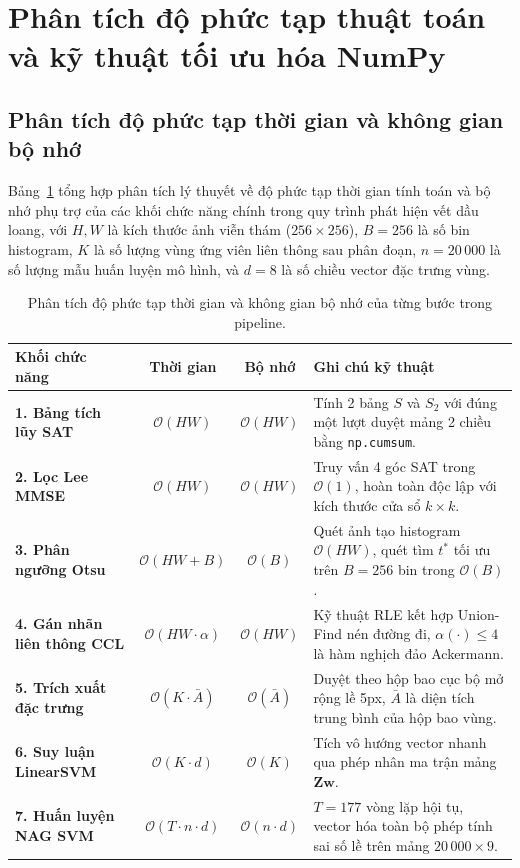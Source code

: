 \section{Phân tích độ phức tạp thuật toán và kỹ thuật tối ưu hóa NumPy}
\label{sec:do_phuc_tap_ky_thuat}

\subsection{Phân tích độ phức tạp thời gian và không gian bộ nhớ}

Bảng~\ref{tab:do_phuc_tap} tổng hợp phân tích lý thuyết về độ phức tạp thời gian tính toán và bộ nhớ phụ trợ của các khối chức năng chính trong quy trình phát hiện vết dầu loang, với $H, W$ là kích thước ảnh viễn thám ($256 \times 256$), $B = 256$ là số bin histogram, $K$ là số lượng vùng ứng viên liên thông sau phân đoạn, $n = 20\,000$ là số lượng mẫu huấn luyện mô hình, và $d = 8$ là số chiều vector đặc trưng vùng.

\begin{table}[!htbp]
\centering
\small
\caption{Phân tích độ phức tạp thời gian và không gian bộ nhớ của từng bước trong pipeline.}
\label{tab:do_phuc_tap}
\begin{tabular}{|l|c|c|p{5.5cm}|}
\hline
\textbf{Khối chức năng} & \textbf{Thời gian} & \textbf{Bộ nhớ} & \textbf{Ghi chú kỹ thuật} \\ \hline
\textbf{1. Bảng tích lũy SAT} & $\mathcal{O}(HW)$ & $\mathcal{O}(HW)$ & Tính 2 bảng $S$ và $S_2$ với đúng một lượt duyệt mảng 2 chiều bằng \texttt{np.cumsum}. \\ \hline
\textbf{2. Lọc Lee MMSE} & $\mathcal{O}(HW)$ & $\mathcal{O}(HW)$ & Truy vấn 4 góc SAT trong $\mathcal{O}(1)$, hoàn toàn độc lập với kích thước cửa sổ $k \times k$. \\ \hline
\textbf{3. Phân ngưỡng Otsu} & $\mathcal{O}(HW + B)$ & $\mathcal{O}(B)$ & Quét ảnh tạo histogram $\mathcal{O}(HW)$, quét tìm $t^*$ tối ưu trên $B=256$ bin trong $\mathcal{O}(B)$. \\ \hline
\textbf{4. Gán nhãn liên thông CCL} & $\mathcal{O}(HW \cdot \alpha)$ & $\mathcal{O}(HW)$ & Kỹ thuật RLE kết hợp Union-Find nén đường đi, $\alpha(\cdot) \le 4$ là hàm nghịch đảo Ackermann. \\ \hline
\textbf{5. Trích xuất đặc trưng} & $\mathcal{O}(K \cdot \bar{A})$ & $\mathcal{O}(\bar{A})$ & Duyệt theo hộp bao cục bộ mở rộng lề 5px, $\bar{A}$ là diện tích trung bình của hộp bao vùng. \\ \hline
\textbf{6. Suy luận LinearSVM} & $\mathcal{O}(K \cdot d)$ & $\mathcal{O}(K)$ & Tích vô hướng vector nhanh qua phép nhân ma trận mảng $\mathbf{Z} \mathbf{w}$. \\ \hline
\textbf{7. Huấn luyện NAG SVM} & $\mathcal{O}(T \cdot n \cdot d)$ & $\mathcal{O}(n \cdot d)$ & $T = 177$ vòng lặp hội tụ, vector hóa toàn bộ phép tính sai số lề trên mảng $20\,000 \times 9$. \\ \hline
\end{tabular}
\end{table}

